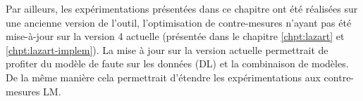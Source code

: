         Par ailleurs, les expérimentations présentées dans ce chapitre ont été réalisées sur une ancienne version de l'outil, l'optimisation de contre-mesures n'ayant pas été mise-à-jour sur la version 4 actuelle (présentée dans le chapitre \ref{chpt:lazart} et \ref{chpt:lazart-implem}).
        La mise à jour sur la version actuelle permettrait de profiter du modèle de faute sur les données (\gls{DL}) et la combinaison de modèles.
        De la même manière cela permettrait d'étendre les expérimentations aux contre-mesures \gls{LM}.